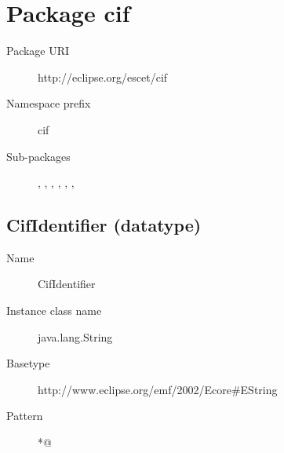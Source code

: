 

\section{Package cif}\label{cifpkg:cif}
\pkgdocucif

\begin{description}
\item[Package URI] http://eclipse.org/escet/cif
\item[Namespace prefix] cif
\item[Sub-packages] , , , , , , 
\end{description}

\subsection{CifIdentifier (datatype)}\label{cifclass:CifIdentifier}
\dtypedocuCifIdentifier

\begin{description}
\item[Name] CifIdentifier
\item[Instance class name] java.lang.String
\item[Basetype] http://www.eclipse.org/emf/2002/Ecore\#EString
\item[Pattern] \verb@[A-Za-z_][A-Za-z0-9_]*@
\end{description}

